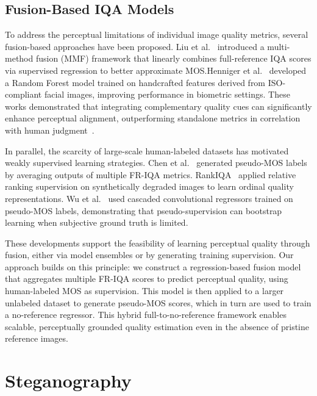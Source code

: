 \subsection{Fusion-Based IQA Models}\label{sec:fusion_iqa}

To address the perceptual limitations of individual image quality metrics, several fusion-based approaches have been proposed. Liu et al.~\cite{liu2013mmf} introduced a multi-method fusion (MMF) framework that linearly combines full-reference IQA scores via supervised regression to better approximate MOS.\@ Henniger et al.~\cite{henniger2020biosig} developed a Random Forest model trained on handcrafted features derived from ISO-compliant facial images, improving performance in biometric settings. These works demonstrated that integrating complementary quality cues can significantly enhance perceptual alignment, outperforming standalone metrics in correlation with human judgment~\cite{robinson2020bias}.

In parallel, the scarcity of large-scale human-labeled datasets has motivated weakly supervised learning strategies. Chen et al.~\cite{chen2021pseudo} generated pseudo-MOS labels by averaging outputs of multiple FR-IQA metrics. RankIQA~\cite{liu2017rankiqa} applied relative ranking supervision on synthetically degraded images to learn ordinal quality representations. Wu et al.~\cite{wu2020cascaded} used cascaded convolutional regressors trained on pseudo-MOS labels, demonstrating that pseudo-supervision can bootstrap learning when subjective ground truth is limited.

These developments support the feasibility of learning perceptual quality through fusion, either via model ensembles or by generating training supervision. Our approach builds on this principle: we construct a regression-based fusion model that aggregates multiple FR-IQA scores to predict perceptual quality, using human-labeled MOS as supervision. This model is then applied to a larger unlabeled dataset to generate pseudo-MOS scores, which in turn are used to train a no-reference regressor. This hybrid full-to-no-reference framework enables scalable, perceptually grounded quality estimation even in the absence of pristine reference images.


\section{Steganography}\label{sec:steganography}

